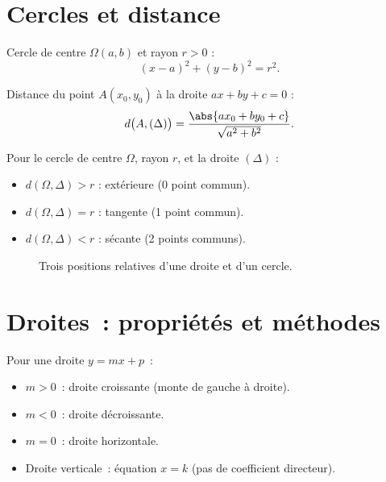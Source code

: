 \section{Cercles et distance}

\begin{defn}
Cercle de centre $\Omega(a,b)$ et rayon $r>0$ :
$$(x-a)^2 + (y-b)^2 = r^2.$$
\end{defn}

\begin{thm}
Distance du point $A(x_0,y_0)$ \`a la droite $ax+by+c=0$ :
$$d\bigl(A,(\Delta)\bigr) = \frac{\abs{ax_0+by_0+c}}{\sqrt{a^2+b^2}}.$$
\end{thm}

\begin{thm}
Pour le cercle de centre $\Omega$, rayon $r$, et la droite $(\Delta)$ :
\begin{itemize}
  \item $d(\Omega,\Delta) > r$ : ext\'erieure (0 point commun).
  \item $d(\Omega,\Delta) = r$ : tangente (1 point commun).
  \item $d(\Omega,\Delta) < r$ : s\'ecante (2 points communs).
\end{itemize}
\end{thm}

\begin{figure}[H]
\centering
{}
\caption{Trois positions relatives d'une droite et d'un cercle.}
\end{figure}


\section{Droites~: propri\'et\'es et m\'ethodes}

\begin{prop}
Pour une droite $y=mx+p$~:
\begin{itemize}
  \item $m>0$~: droite croissante (monte de gauche \`a droite).
  \item $m<0$~: droite d\'ecroissante.
  \item $m=0$~: droite horizontale.
  \item Droite verticale~: \'equation $x=k$ (pas de coefficient directeur).
\end{itemize}
\end{prop}

